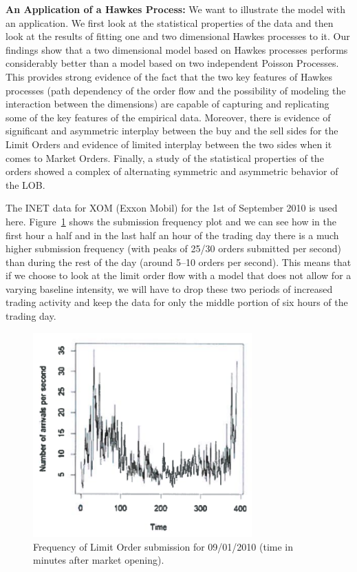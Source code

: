 \noindent\textbf{An Application of a Hawkes Process:} We want to illustrate the model with an application. We first look at the statistical properties of the data and then look at the results of fitting one and two dimensional Hawkes processes to it. Our findings show that a two dimensional model based on Hawkes processes performs considerably better than a model based on two independent Poisson Processes. This provides strong evidence of the fact that the two key features of Hawkes processes (path dependency of the order flow and the possibility of modeling the interaction between the dimensions) are capable of capturing and replicating some of the key features of the empirical data. Moreover, there is evidence of significant and asymmetric interplay between the buy and the sell sides for the Limit Orders and evidence of limited interplay between the two sides when it comes to Market Orders. Finally, a study of the statistical properties of the orders showed a complex of alternating symmetric and asymmetric behavior of the LOB. 


The INET data for XOM (Exxon Mobil) for the 1st of September 2010 is used here. Figure~\ref{fig:freqsubmitarrivals} shows the submission frequency plot and we can see how in the first hour a half and in the last half an hour of the trading day there is a much higher submission frequency (with peaks of 25/30 orders submitted per second) than during the rest of the day (around 5--10 orders per second). This means that if we choose to look at the limit order flow with a model that does not allow for a varying baseline intensity, we will have to drop these two periods of increased trading activity and keep the data for only the middle portion of six hours of the trading day.
	\begin{figure}[!ht]
   	\centering
   	\includegraphics[width=0.75\textwidth]{chapters/chapter_trade_data_models/figures/freqsubmit.png} 
   	\caption{Frequency of Limit Order submission for 09/01/2010 (time in minutes after market opening).\label{fig:freqsubmitarrivals}}
	\end{figure}


